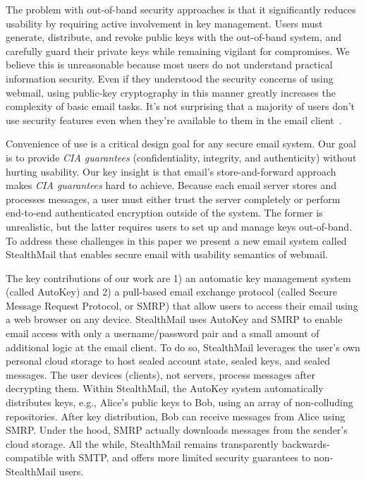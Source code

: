 The problem with out-of-band security approaches is that it significantly 
reduces usability by requiring active involvement in key management. 
Users must generate, distribute, and revoke public keys with the out-of-band 
system, and carefully guard their private keys while remaining vigilant 
for compromises. We believe this is unreasonable because most users do 
not understand practical information security. Even if they 
understood the security concerns of using webmail, using public-key cryptography in this 
manner greatly increases the complexity of basic email tasks. It's not surprising that a majority of users don't use security features even when they're available to them in the email client~\cite{garfinkel-email-survey}. 

Convenience of use is a critical design goal for any secure email system.
Our goal is to provide \emph{CIA guarantees} (confidentiality, integrity, and authenticity) without hurting usability.  
Our key insight is that email's store-and-forward approach makes \emph{CIA 
guarantees} hard to achieve. Because each email server stores and processes 
messages, a user must either trust the server completely or perform end-to-end authenticated encryption outside of the system. 
The former is unrealistic, but the latter requires users to set up and 
manage keys out-of-band. To address these challenges in this paper we 
present a new email system called StealthMail that enables secure email with usability semantics of webmail.

The key contributions of our work are 1) an automatic key management system 
(called AutoKey) and 2) a pull-based email exchange protocol (called Secure Message 
Request Protocol, or SMRP) that allow users to access their email using a 
web browser on any device. StealthMail uses AutoKey and SMRP to enable email access with only a 
username/password pair and a small amount of additional logic at the 
email client. To do so, StealthMail leverages the user's own personal cloud 
storage to host sealed account state, sealed keys, and sealed messages. 
The user devices (clients), not servers, process messages after decrypting 
them. Within StealthMail, the AutoKey system automatically distributes keys, 
e.g., Alice's public keys to Bob, using an array of non-colluding 
repositories. After key distribution, Bob can receive 
messages from Alice using SMRP. Under the hood, SMRP 
actually downloads messages from the sender's cloud storage. All the while, 
StealthMail remains transparently backwards-compatible with SMTP, and offers 
more limited security guarantees to non-StealthMail users.

